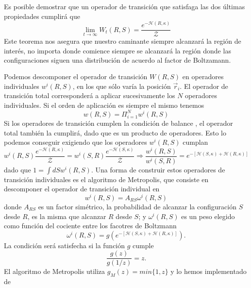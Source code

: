 Es posible demostrar que un operador de transición que satisfaga las dos
últimas propiedades cumplirá que
\begin{equation}
\lim_{t\rightarrow \infty}W_t(R,S)=\frac{e^{-\mathcal{H}(R,\kappa)}}{\mathcal{Z}}
\end{equation}
Este teorema nos asegura que nuestro caminante siempre alcanzará la región de
interés, no importa donde comience siempre se alcanzará la región donde las configuraciones siguen una
distribución de acuerdo al factor de Boltzamann. 

Podemos descomponer el operador de transición $W(R,S)$ en operadores
individuales $w^i(R,S)$, en los que sólo varía la posición $\vec{r}_i$. El
operador de transición total corresponderá a aplicar sucesivamente los $N$
operadores individuales. Si el orden de aplicación es siempre el mismo tenemos
\begin{equation*}
w(R,S)=\Pi^{N}_{i=1}w^i(R,S)
\end{equation*}
Si los operadores de transición cumplen la condición de
balance \label{ecuacion_balance}, el operador total también la cumplirá, dado
que es un producto de operadores. Esto lo podemos conseguir exigiendo que los operadores
$w^i(R,S)$ cumplan
\begin{equation}\label{balance_detallado}
w^i(R,S)\frac{e^{-\mathcal{H}(R,\kappa)}}{\mathcal{Z}}=w^i(S,R)\frac{e^{-\mathcal{H}(S,\kappa)}}{\mathcal{Z}}\Rightarrow \frac{w^i(R,S)}{w^i(S,R)}=e^{-[\mathcal{H}(S,\kappa)+\mathcal{H}(R,\kappa)]}
\end{equation}
dado que $1=\int dS w^i(R,S)$. Una forma de construir estos operadores de
transición individuales es el algoritmo de Metropolis, que consiste en
descomponer el operador de transición individual en 
 \begin{equation*}
 w^i(R,S)=A_{RS}\omega^i(R,S)
\end{equation*}
donde $A_{RS}$ es un factor simétrico, la probabilidad de alcanzar la
configuración $S$ desde $R$, es la misma que alcanzar $R$ desde $S$; y
$\omega^i(R,S)$ es un peso elegido como función del cociente entre los
facotres de Boltzmann
\begin{equation*}
\omega^i(R,S)=g(e^{-[\mathcal{H}(S,\kappa)+\mathcal{H}(R,\kappa)]}).
\end{equation*}
La condición \label{balance_detallado} será satisfecha si la función $g$
cumple
\begin{equation}
\frac{g(z)}{g(1/z)}=z.
\end{equation}
El algoritmo de Metropolis utiliza $g_M(z)=min\{1,z\}$ y lo hemos implementado de
